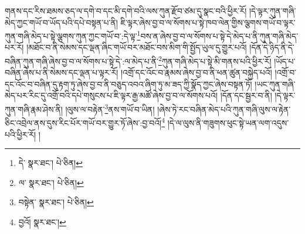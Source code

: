 གནས་དང་རིས་ཐམས་ཅད་ལ་དགེ་བ་དང་མི་དགེ་བའི་ལས་ཀུན་རྫོབ་ཙམ་དུ་སྣང་བའི་ཕྱིར་རོ། །དེ་ལྟར་ཀུན་གཞི་མེད་ཀྱང་གཡོ་བ་ཡོད་པའི་དཔེ་བསྟན་པ་ནི། ཇི་ལྟར་ཞེས་བྱ་བ་ལ་སོགས་པ་སྟེ་ཁབ་ལེན་གྱིས་ལྕགས་གཡོ་བ་ལྟར་ཀུན་གཞི་མེད་པ་སྟེ་ལྕགས་ཀུན་ཀྱང་གཡོ་བ་:དེ་ལྟ་\footnote{དེ་  སྣར་ཐང་།  པེ་ཅིན། }བས་ན་ཞེས་བྱ་བ་ལ་སོགས་པ་སྟེ་དེ་མེད་པ་ནི་ཀུན་གཞི་མེད་པར་རོ། །མཐོང་བ་ནི་སེམས་དང་ལྡན་ཞིང་གཡོ་བར་མཐོང་བས་མིག་གི་སྤྱོད་ཡུལ་དུ་གྱུར་པའོ། །དོན་དེ་ཉིད་ནི་དེ་བཞིན་ཀུན་གཞི་ཞེས་བྱ་བ་ལ་སོགས་པ་སྟེ་དེ་:ལ་མེད་པ་ནི་\footnote{ལ་  སྣར་ཐང་།  པེ་ཅིན། }ཀུན་གཞི་མེད་པ་སྟེ་མི་གནས་པའི་ཕྱིར་རོ། །ཡོད་པ་བཞིན་ཞེས་པ་ནི་སེམས་དང་ལྡན་པ་ལྟར་རོ། །འགྲོ་དང་འོང་བ་རྣམས་ཞེས་བྱ་བ་ནི་ཕན་ཚུན་བསྐྱེད་པའོ། །འགྲོ་བ་དང་འོང་བ་བཞིན་དུ་རྟག་ཏུ་ཞེས་བྱ་བ་ནི་བཅུད་འབའ་ཞིག་ཏུ་མ་ཟད་ཀྱི་སྣོད་ཀྱང་ཞེས་བསྟན་ཏོ། །ཡང་ཀུན་གཞི་མེད་པར་རིང་དུ་འགྲོ་བའི་དཔེ་གསུངས་པ་ཇི་ལྟར་རྒྱ་མཚོ་ཞེས་བྱ་བ་ལ་སོགས་པའོ། །དོན་དང་སྦྱར་བ་ནི། །དེ་ལྟར་ཀུན་གཞི་རྣམ་ཤེས་ནི། །ལུས་ལ་བརྟེན་\footnote{བསྟེན་  སྣར་ཐང་།  པེ་ཅིན། }ནས་གཡོ་བ་ཡིན། །ཞེས་ཏེ་རང་བཞིན་མེད་པའི་ཀུན་གཞི་ལུས་ལ་རྟེན་ཅིང་འབྲེལ་ནས་དུས་རིང་པོར་གཡོ་བར་གྱུར་ཏོ་ཞེས་:བྱ་བའོ།\footnote{བྱའོ།  སྣར་ཐང་། } །དེ་ལ་ལུས་ནི་གཟུགས་ཕུང་སྟེ་ཡན་ལག་འདུས་པའི་ཕྱིར་རོ། །
